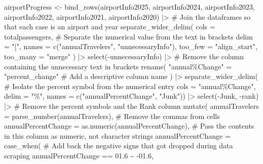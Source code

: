 \documentclass[
  letterpaper,
  DIV=11,
  numbers=noendperiod]{scrartcl}
\newenvironment{Shaded}{\begin{snugshade}}{\end{snugshade}}
\newcommand{\AttributeTok}[1]{\textcolor[rgb]{0.40,0.45,0.13}{#1}}
\newcommand{\CommentTok}[1]{\textcolor[rgb]{0.37,0.37,0.37}{#1}}
\newcommand{\FloatTok}[1]{\textcolor[rgb]{0.68,0.00,0.00}{#1}}
\newcommand{\FunctionTok}[1]{\textcolor[rgb]{0.28,0.35,0.67}{#1}}
\newcommand{\NormalTok}[1]{\textcolor[rgb]{0.00,0.23,0.31}{#1}}
\newcommand{\OtherTok}[1]{\textcolor[rgb]{0.00,0.23,0.31}{#1}}
\newcommand{\SpecialCharTok}[1]{\textcolor[rgb]{0.37,0.37,0.37}{#1}}
\newcommand{\StringTok}[1]{\textcolor[rgb]{0.13,0.47,0.30}{#1}}
\begin{document}
\begin{Shaded}
\begin{Highlighting}[]
\NormalTok{airportProgress }\OtherTok{\textless{}{-}} \FunctionTok{bind\_rows}\NormalTok{(airportInfo2025, airportInfo2024,}
\NormalTok{                             airportInfo2023, airportInfo2022, airportInfo2021, airportInfo2020) }\SpecialCharTok{|\textgreater{}} 
  \CommentTok{\# Join the dataframes so that each case is an airport and year }
  \FunctionTok{separate\_wider\_delim}\NormalTok{( }
    \AttributeTok{cols =}\NormalTok{ totalpassengers, }\CommentTok{\# Separate the numerical value from the text in brackets}
    \AttributeTok{delim =} \StringTok{"["}\NormalTok{,}
    \AttributeTok{names =} \FunctionTok{c}\NormalTok{(}\StringTok{"annualTravelers"}\NormalTok{, }\StringTok{"unnecessaryInfo"}\NormalTok{),}
    \AttributeTok{too\_few =} \StringTok{"align\_start"}\NormalTok{,}
    \AttributeTok{too\_many =} \StringTok{"merge"}
\NormalTok{  ) }\SpecialCharTok{|\textgreater{}}
  \FunctionTok{select}\NormalTok{(}\SpecialCharTok{{-}}\NormalTok{unnecessaryInfo) }\SpecialCharTok{|\textgreater{}} \CommentTok{\# Remove the column containing the unnecessary text in brackets}
  \FunctionTok{rename}\NormalTok{(}
    \StringTok{"annual\%Change"} \OtherTok{=} \StringTok{"percent\_change"} \CommentTok{\# Add a descriptive column name}
\NormalTok{  ) }\SpecialCharTok{|\textgreater{}}
  \FunctionTok{separate\_wider\_delim}\NormalTok{( }\CommentTok{\# Isolate the percent symbol from the numerical entry}
    \AttributeTok{cols =} \StringTok{"annual\%Change"}\NormalTok{,}
    \AttributeTok{delim =} \StringTok{"\%"}\NormalTok{,}
    \AttributeTok{names =} \FunctionTok{c}\NormalTok{(}\StringTok{"annualPercentChange"}\NormalTok{, }\StringTok{"Junk"}\NormalTok{)) }\SpecialCharTok{|\textgreater{}}
  \FunctionTok{select}\NormalTok{(}\SpecialCharTok{{-}}\NormalTok{Junk, }\SpecialCharTok{{-}}\NormalTok{rank) }\SpecialCharTok{|\textgreater{}} \CommentTok{\# Remove the percent symbols and the Rank column}
  \FunctionTok{mutate}\NormalTok{(}
    \AttributeTok{annualTravelers =} \FunctionTok{parse\_number}\NormalTok{(annualTravelers), }
    \CommentTok{\# Remove the commas from cells}
    \AttributeTok{annualPercentChange =} \FunctionTok{as.numeric}\NormalTok{(annualPercentChange), }
    \CommentTok{\# Pass the contents in this column as numeric, not character strings}
    \AttributeTok{annualPercentChange =} \FunctionTok{case\_when}\NormalTok{( }
      \CommentTok{\# Add back the negative signs that got dropped during data scraping }
\NormalTok{      annualPercentChange }\SpecialCharTok{==} \FloatTok{01.6} \SpecialCharTok{\textasciitilde{}} \SpecialCharTok{{-}}\FloatTok{01.6}\NormalTok{,}

\end{Highlighting}
\end{Shaded}
\end{document}
